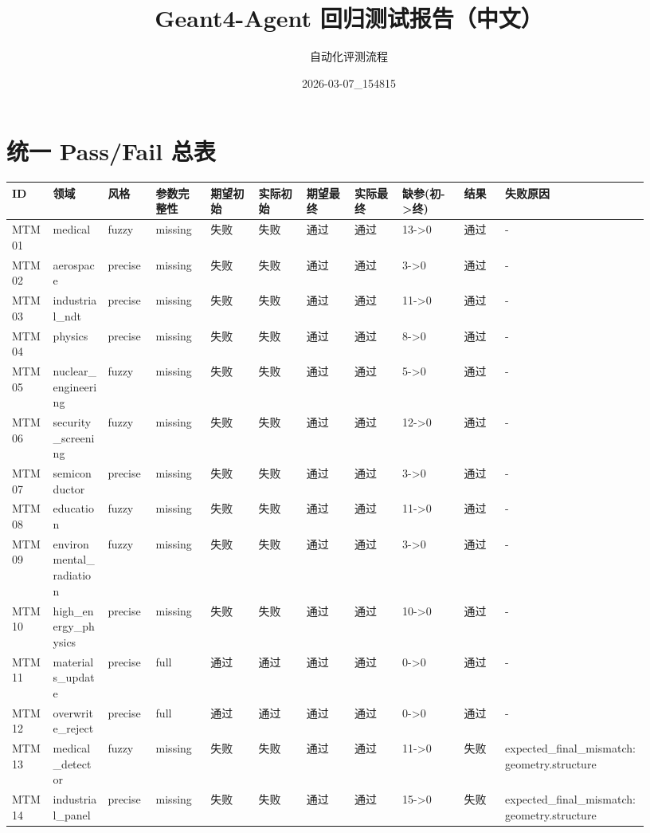 \documentclass[11pt]{ctexart}
\title{Geant4-Agent 回归测试报告（中文）}
\author{自动化评测流程}
\date{2026-03-07\_154815}
\begin{document}
\maketitle
\section{统一 Pass/Fail 总表}
\begin{longtable}{p{0.06\linewidth}p{0.08\linewidth}p{0.07\linewidth}p{0.08\linewidth}p{0.07\linewidth}p{0.07\linewidth}p{0.07\linewidth}p{0.07\linewidth}p{0.09\linewidth}p{0.06\linewidth}p{0.21\linewidth}}
\toprule
ID & 领域 & 风格 & 参数完整性 & 期望初始 & 实际初始 & 期望最终 & 实际最终 & 缺参(初->终) & 结果 & 失败原因 \\
\midrule
MTM01 & medical & fuzzy & missing & 失败 & 失败 & 通过 & 通过 & 13->0 & 通过 & - \\
MTM02 & aerospace & precise & missing & 失败 & 失败 & 通过 & 通过 & 3->0 & 通过 & - \\
MTM03 & industrial\_ndt & precise & missing & 失败 & 失败 & 通过 & 通过 & 11->0 & 通过 & - \\
MTM04 & physics & precise & missing & 失败 & 失败 & 通过 & 通过 & 8->0 & 通过 & - \\
MTM05 & nuclear\_engineering & fuzzy & missing & 失败 & 失败 & 通过 & 通过 & 5->0 & 通过 & - \\
MTM06 & security\_screening & fuzzy & missing & 失败 & 失败 & 通过 & 通过 & 12->0 & 通过 & - \\
MTM07 & semiconductor & precise & missing & 失败 & 失败 & 通过 & 通过 & 3->0 & 通过 & - \\
MTM08 & education & fuzzy & missing & 失败 & 失败 & 通过 & 通过 & 11->0 & 通过 & - \\
MTM09 & environmental\_radiation & fuzzy & missing & 失败 & 失败 & 通过 & 通过 & 3->0 & 通过 & - \\
MTM10 & high\_energy\_physics & precise & missing & 失败 & 失败 & 通过 & 通过 & 10->0 & 通过 & - \\
MTM11 & materials\_update & precise & full & 通过 & 通过 & 通过 & 通过 & 0->0 & 通过 & - \\
MTM12 & overwrite\_reject & precise & full & 通过 & 通过 & 通过 & 通过 & 0->0 & 通过 & - \\
MTM13 & medical\_detector & fuzzy & missing & 失败 & 失败 & 通过 & 通过 & 11->0 & 失败 & expected\_final\_mismatch:geometry.structure \\
MTM14 & industrial\_panel & precise & missing & 失败 & 失败 & 通过 & 通过 & 15->0 & 失败 & expected\_final\_mismatch:geometry.structure \\

\end{longtable}
\end{document}
